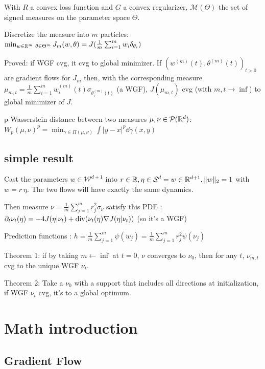 With $R$ a convex loss function and $G$ a convex regularizer, $\mathcal{M}(\Theta)$ the set of signed measures on the parameter space $\Theta$.

Discretize the measure into $m$ particles: $\min_{w \in \mathbb{R}^m \\\ \theta \in \Theta^m} J_m(w, \theta) = J( \frac{1}{m} \sum_{i=1}^{m} w_i \delta_{\theta_i})$

Proved: if WGF cvg, it cvg to global minimizer. If $(w^{(m)}(t), \theta^{(m)}(t))_{t>0}$ are gradient flows for $J_m$ then, with the corresponding measure $\mu_{m,t} = \frac{1}{m} \sum_{i=1}^{m} w^{(m)}_i(t) \sigma_{\theta_i^{(m)}(t)}$ (a WGF), $J(\mu_{m, t})$ cvg (with $m, t \rightarrow \inf$) to global minimizer of $J$.

p-Wasserstein distance between two measures $\mu, \nu \in \mathcal{P}(\mathbb{R}^d)$: $W_p(\mu, \nu)^p = \min_{\gamma \in \Pi(\mu, \nu)} \int |y - x|^p \dd \gamma(x, y)$

\subsection{simple result}

Cast the parameters $w \in \mathcal{W}^{d+1}$ into $r \in \mathbb{R}, \eta \in \mathcal{S}^d = {w \in \mathbb{R}^{d+1}, \lVert w\rVert_2 = 1}$ with $w = r ~ \eta$. The two flows will have exactly the same dynamics.

Then measure $\nu= \frac{1}{m}\sum_{j=1}^{m} r^2_j \sigma_{\nu}$ satisfy this PDE : $\partial_t \nu_t(\eta) = -4 J(\eta | \nu_t) + \operatorname*{div}(\nu_t(\eta) \nabla J(\eta | \nu_t)) $ (so it's a WGF)

Prediction functions : $h = \frac{1}{m} \sum_{j=1}^{m} \psi(w_j) = \frac{1}{m}\sum_{j=1}^{m} r_j^2 \psi(\nu_j)$

Theorem 1: if by taking $m \leftarrow \inf$ at $t=0$, $\nu$ converges to $\nu_0$, then for any $t$, $\nu_{m, t}$ cvg to the unique WGF $\nu_t$.

Theorem 2: Take a $\nu_0$ with a support that includes all directions at initialization, if WGF $\nu_t$ cvg, it's to a global optimum.

\section{Math introduction}

\subsection{Gradient Flow}

